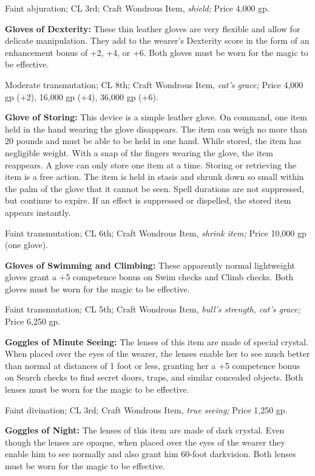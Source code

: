 \documentclass{article}
\begin{document}
Faint abjuration; CL 3rd; Craft Wondrous Item, \textit{shield; }Price 4,000 gp.

\textbf{Gloves of Dexterity:} These thin leather gloves are very flexible and allow 
for delicate manipulation. They add to the wearer's Dexterity score in the form 
of an enhancement bonus of +2, +4, or +6. Both gloves must be worn for the magic 
to be effective.

Moderate transmutation; CL 8th; Craft Wondrous Item, \textit{cat's grace; }Price 
4,000 gp (+2), 16,000 gp (+4), 36,000 gp (+6).

\textbf{Glove of Storing:} This device is a simple leather glove. On command, one 
item held in the hand wearing the glove disappears. The item can weigh no more 
than 20 pounds and must be able to be held in one hand. While stored, the item 
has negligible weight. With a snap of the fingers wearing the glove, the item reappears. 
A glove can only store one item at a time. Storing or retrieving the item is a 
free action. The item is held in stasis and shrunk down so small within the palm 
of the glove that it cannot be seen. Spell durations are not suppressed, but continue 
to expire. If an effect is suppressed or dispelled, the stored item appears instantly.

Faint transmutation; CL 6th; Craft Wondrous Item, \textit{shrink item; }Price 10,000 
gp (one glove).

\textbf{Gloves of Swimming and Climbing: }These apparently normal lightweight gloves 
grant a +5 competence bonus on Swim checks and Climb checks. Both gloves must be 
worn for the magic to be effective.

Faint transmutation; CL 5th; Craft Wondrous Item, \textit{bull's strength, cat's 
grace; }Price 6,250 gp.

\textbf{Goggles of Minute Seeing:} The lenses of this item are made of special 
crystal. When placed over the eyes of the wearer, the lenses enable her to see 
much better than normal at distances of 1 foot or less, granting her a +5 competence 
bonus on Search checks to find secret doors, traps, and similar concealed objects. 
Both lenses must be worn for the magic to be effective.

Faint divination; CL 3rd; Craft Wondrous Item, \textit{true seeing; }Price 1,250 
gp.

\textbf{Goggles of Night:} The lenses of this item are made of dark crystal. Even 
though the lenses are opaque, when placed over the eyes of the wearer they enable 
him to see normally and also grant him 60-foot darkvision. Both lenses must be 
worn for the magic to be effective.
\end{document}
